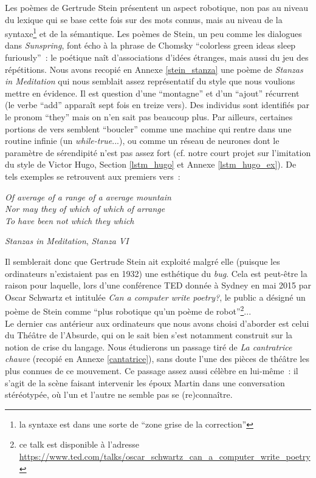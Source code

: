 \documentclass{article}
\newenvironment{citationbox}
{\begin{center}
		\begin{minipage}{.8\textwidth}
		}
		{
		\end{minipage}	
\end{center}
}
\begin{document}
				Les poèmes de Gertrude Stein présentent un aspect robotique, non pas au niveau du lexique qui se base cette fois sur des mots connus, mais au niveau de la syntaxe\footnote{la syntaxe est dans une sorte de ``zone grise de la correction''} et de la sémantique. Les poèmes de Stein, un peu comme les dialogues dans \textit{Sunspring}, font écho à la phrase de Chomsky ``colorless green ideas sleep furiously''~: le poétique naît d'associations d'idées étranges, mais aussi du jeu des répétitions. Nous avons recopié en Annexe \ref{stein_stanza} une poème de \textit{Stanzas in Meditation} qui nous semblait assez représentatif du style que nous voulions mettre en évidence. Il est question d'une ``montagne'' et d'un ``ajout'' récurrent (le verbe ``add'' apparaît sept fois en treize vers). Des individus sont identifiés par le pronom ``they'' mais on n'en sait pas beaucoup plus. Par ailleurs, certaines portions de vers semblent ``boucler'' comme une machine qui rentre dans une routine infinie (un \textit{while-true}...), ou comme un réseau de neurones dont le paramètre de sérendipité n'est pas assez fort (cf. notre court projet sur l'imitation du style de Victor Hugo, Section \ref{lstm_hugo} et Annexe \ref{lstm_hugo_ex}). De tels exemples se retrouvent aux premiers vers~: 
				\begin{citationbox}
					\textit{Of average of a range of a average mountain\\
						Nor may they of which of which of arrange\\
						To have been not which they which}
					\begin{flushright}
						\textit{Stanzas in Meditation}, \textit{Stanza VI} \cite{stein1932}
					\end{flushright}
				\end{citationbox}
				Il semblerait donc que Gertrude Stein ait exploité malgré elle (puisque les ordinateurs n'existaient pas en 1932) une esthétique du \textit{bug}. Cela est peut-être la raison pour laquelle, lors d'une conférence TED donnée à Sydney en mai 2015 par Oscar Schwartz et intitulée \textit{Can a computer write poetry?}, le public a désigné un poème de Stein comme ``plus robotique qu'un poème de robot''\footnote{ce talk est disponible à l'adresse \href{https://www.ted.com/talks/oscar_schwartz_can_a_computer_write_poetry}{https://www.ted.com/talks/oscar\_schwartz\_can\_a\_computer\_write\_poetry}}...\\
				
				Le dernier cas antérieur aux ordinateurs que nous avons choisi d'aborder est celui du Théâtre de l'Absurde, qui on le sait bien s'est notamment construit sur la notion de crise du langage. Nous étudierons un passage tiré de \textit{La cantratrice chauve} \cite{ionesco1950} (recopié en Annexe \ref{cantatrice}), sans doute l'une des pièces de théâtre les plus connues de ce mouvement. Ce passage assez aussi célèbre en lui-même~: il s'agit de la scène faisant intervenir les époux Martin dans une conversation stéréotypée, où l'un et l'autre ne semble pas se (re)connaître.\\
				
\end{document}
